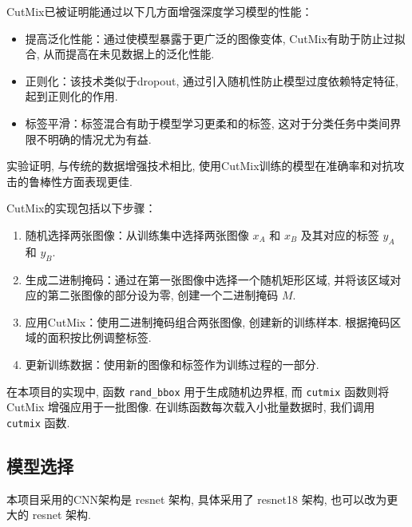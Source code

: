 \documentclass[notitlepage,cs4size,punct,oneside]{ctexrep}
\numberwithin{equation}{chapter}
\theoremstyle{mystyle}
\begin{document}
CutMix已被证明能通过以下几方面增强深度学习模型的性能：
\begin{itemize}
    \item 提高泛化性能：通过使模型暴露于更广泛的图像变体, CutMix有助于防止过拟合, 从而提高在未见数据上的泛化性能.
    \item 正则化：该技术类似于dropout, 通过引入随机性防止模型过度依赖特定特征, 起到正则化的作用.
    \item 标签平滑：标签混合有助于模型学习更柔和的标签, 这对于分类任务中类间界限不明确的情况尤为有益.
\end{itemize}
实验证明, 与传统的数据增强技术相比, 使用CutMix训练的模型在准确率和对抗攻击的鲁棒性方面表现更佳.

CutMix的实现包括以下步骤：
\begin{enumerate}
    \item 随机选择两张图像：从训练集中选择两张图像 $x_A$ 和 $x_B$ 及其对应的标签 $y_A$ 和 $y_B$.
    \item 生成二进制掩码：通过在第一张图像中选择一个随机矩形区域, 并将该区域对应的第二张图像的部分设为零, 创建一个二进制掩码 $M$.
    \item 应用CutMix：使用二进制掩码组合两张图像, 创建新的训练样本. 根据掩码区域的面积按比例调整标签.
    \item 更新训练数据：使用新的图像和标签作为训练过程的一部分.
\end{enumerate}

在本项目的实现中, 函数 \texttt{rand\_bbox} 用于生成随机边界框, 而 \texttt{cutmix} 函数则将 CutMix 增强应用于一批图像. 在训练函数每次载入小批量数据时, 我们调用\texttt{cutmix} 函数.


\subsection{模型选择}
本项目采用的CNN架构是 resnet 架构, 具体采用了 resnet18 架构, 也可以改为更大的 resnet 架构.
\end{document}

